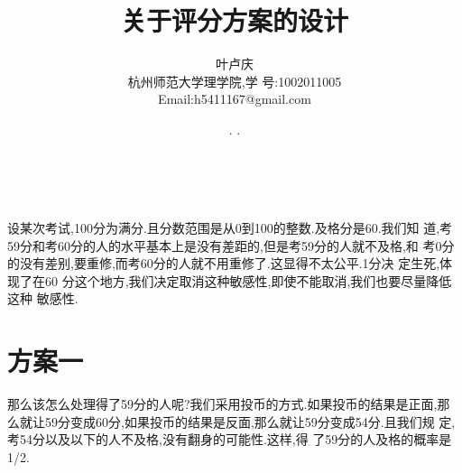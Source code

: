 \documentclass[a4paper, 12pt]{article} %
\makeatletter
\renewcommand{\maketitle}{ %
  \renewcommand\refname{参考文献}
  \newcommand{\D}{\displaystyle}\newcommand{\ri}{\Rightarrow}
  \newcommand{\ds}{\displaystyle} \renewcommand{\ni}{\noindent}
  \newcommand{\pa}{\partial} \newcommand{\Om}{\Omega}
  \newcommand{\om}{\omega} \newcommand{\sik}{\sum_{i=1}^k}
  \newcommand{\vov}{\Vert\omega\Vert} \newcommand{\Umy}{U_{\mu_i,y^i}}
  \newcommand{\lamns}{\lambda_n^{^{\scriptstyle\sigma}}}
  \newcommand{\chiomn}{\chi_{_{\Omega_n}}}
  \newcommand{\ullim}{\underline{\lim}} \newcommand{\bsy}{\boldsymbol}
  \newcommand{\mvb}{\mathversion{bold}} \newcommand{\la}{\lambda}
  \newcommand{\La}{\Lambda} \newcommand{\va}{\varepsilon}
  \newcommand{\be}{\beta} \newcommand{\al}{\alpha}
  \newcommand{\dis}{\displaystyle} \newcommand{\R}{{\mathbb R}}
  \newcommand{\N}{{\mathbb N}} \newcommand{\cF}{{\mathcal F}}
  \newcommand{\gB}{{\mathfrak B}} \newcommand{\eps}{\epsilon}
  \begin{flushright} %
    {\LARGE\@title} %
    
    \vspace{50pt} %
    
    {\large\@author} %
    \\\@date %
    
    \vspace{40pt} %
  \end{flushright}
}
\makeatother
\begin{document}
\begin{CJK}{UTF8}{gkai}
  \title{\textbf{关于评分方案的设计}}
  \author{\small{叶卢庆}\\{\small{杭州师范大学理学院,学
        号:1002011005}}\\{\small{Email:h5411167@gmail.com}}} %
  \renewcommand{\today}{\number\year. \number\month. \number\day}
  \date{\today} %
  
  
  
  \maketitle %
  
  
  
  
  
  
  
  设某次考试,100分为满分.且分数范围是从0到100的整数.及格分是60.我们知
  道,考59分和考60分的人的水平基本上是没有差距的,但是考59分的人就不及格,和
  考0分的没有差别,要重修,而考60分的人就不用重修了.这显得不太公平.1分决
  定生死,体现了在60
  分这个地方,我们决定取消这种敏感性,即使不能取消,我们也要尽量降低这种
  敏感性.\\

\section*{方案一}
  那么该怎么处理得了59分的人呢?我们采用投币的方式.如果投币的结果是正面,那
  么就让59分变成60分,如果投币的结果是反面,那么就让59分变成54分.且我们规
  定,考54分以及以下的人不及格,没有翻身的可能性.这样,得
  了59分的人及格的概率是1/2.\\


\end{CJK}
\end{document}
